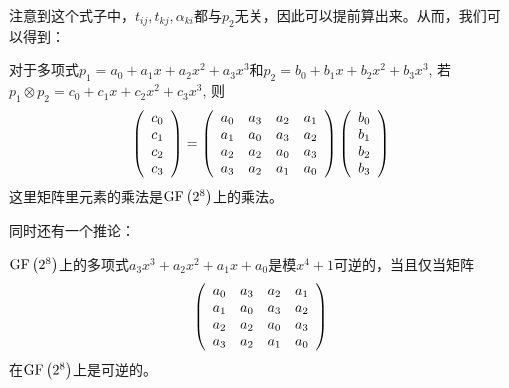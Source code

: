 注意到这个式子中，$t_{ij}, t_{kj}, \alpha_{ki}$都与$p_2$无关，因此可以提前算出来。从而，我们可以得到：
\begin{theorem}
对于多项式$p_1=a_0+a_1x+a_2x^2+a_3x^3$和$p_2=b_0+b_1x+b_2x^2+b_3x^3$, 若$p_1\otimes p_2=c_0+c_1x+c_2x^2+c_3x^3$, 则
\begin{equation}
\left( {\begin{array}{c}c_0\\c_1\\c_2\\c_3\end{array}}\right)=\left( {\begin{array}{cccc}a_0&a_3&a_2&a_1\\a_1&a_0&a_3&a_2\\a_2&a_2&a_0&a_3\\a_3&a_2&a_1&a_0\end{array}}\right)\left( {\begin{array}{c}b_0\\b_1\\b_2\\b_3\end{array}}\right)
\end{equation}
这里矩阵里元素的乘法是$\mathrm{GF}\left( {2^8}\right)$上的乘法。
\end{theorem}

同时还有一个推论：
\begin{theorem}
$\mathrm{GF}\left( {2^8}\right)$上的多项式$a_3x^3+a_2x^2+a_1x+a_0$是模$x^4+1$可逆的，当且仅当矩阵
\[\left( {\begin{array}{cccc}a_0&a_3&a_2&a_1\\a_1&a_0&a_3&a_2\\a_2&a_2&a_0&a_3\\a_3&a_2&a_1&a_0\end{array}}\right)\]
在$\mathrm{GF}\left( {2^8}\right)$上是可逆的。
\end{theorem}
